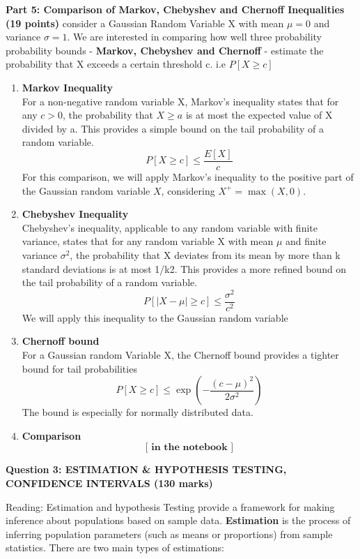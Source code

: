 \documentclass[a3paper,12pt]{extarticle} %
\begin{document}
    \subitem \textbf{Part 5: Comparison of Markov, Chebyshev and Chernoff Inequalities (19 points)}
    consider a Gaussian Random Variable X with mean \(\mu = 0\) and variance \(\sigma = 1\). We are interested in comparing how well three probability probability bounds - \textbf{Markov, Chebyshev and Chernoff} - estimate the probability that X exceeds a certain threshold c. i.e \(P[X \geq c]\)
    \begin{enumerate}
        \item \textbf{ Markov Inequality}
        \\ For a non-negative random variable X, Markov's inequality states that for any \(c > 0\), the probability that \(X \geq a\) is at most the expected value of X divided by a. This provides a simple bound on the tail probability of a random variable.
        \[
        P[X \geq c] \leq \frac{E[X]}{c}
        \]
        For this comparison, we will apply Markov's inequality to the positive part of the Gaussian random variable \(X\), considering \(X^{+} = \max(X, 0)\).
        \item \textbf{ Chebyshev Inequality}
        \\ Chebyshev's inequality, applicable to any random variable with finite variance, states that for any random variable X with mean \(\mu\) and finite variance \(\sigma^2\), the probability that X deviates from its mean by more than k standard deviations is at most 1/k2. This provides a more refined bound on the tail probability of a random variable.
        \[
        P[|X - \mu| \geq c] \leq \frac{\sigma^2}{c^2}
        \]
        We will apply this inequality to the Gaussian random variable
        \item \textbf{ Chernoff bound}
        \\ For a Gaussian random Variable X, the Chernoff bound provides a tighter bound for tail probabilities
        \[
        P[X \geq c] \leq \exp(-\frac{(c-\mu)^2}{2\sigma^2})
        \]
        The bound is especially for normally distributed data.
        \item \textbf{ Comparison}
        \[
        \textbf{[ in the notebook ]}
        \]
    \end{enumerate}
    \newpage
    \begin{center}
        \large \textbf{Question 3: ESTIMATION \& HYPOTHESIS TESTING, CONFIDENCE INTERVALS (130 marks)}
    \end{center}
    Reading: Estimation and hypothesis Testing provide a framework for making inference about populations based on sample data. \textbf{Estimation} is the process of inferring population parameters (such as means or proportions) from sample statistics. There are two main types of estimations:
\end{document}
